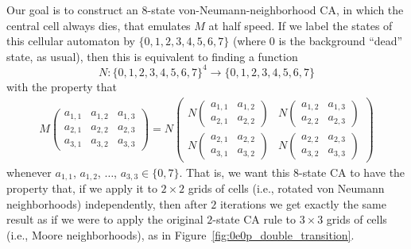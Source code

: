 Our goal is to construct an $8$-state von-Neumann-neighborhood CA, in which the central cell always dies, that emulates $M$ at half speed. If we label the states of this cellular automaton by $\{ 0, 1, 2, 3, 4, 5, 6, 7 \}$ (where $0$ is the background ``dead'' state, as usual), then this is equivalent to finding a function
\[
	N : \{ 0, 1, 2, 3, 4, 5, 6, 7 \}^4 \rightarrow
	\{0, 1, 2, 3, 4, 5, 6, 7 \}
\]
with the property that
\begin{align}\label{eq:0e0p_N_from_M}
	M\begin{pmatrix}
		a_{1,1} & a_{1,2} & a_{1,3} \\
		a_{2,1} & a_{2,2} & a_{2,3} \\
		a_{3,1} & a_{3,2} & a_{3,3}
	\end{pmatrix} = N\begin{pmatrix}
		N\begin{pmatrix}
		a_{1,1} & a_{1,2} \\
		a_{2,1} & a_{2,2}
		\end{pmatrix} & N\begin{pmatrix}
		a_{1,2} & a_{1,3} \\
		a_{2,2} & a_{2,3}
		\end{pmatrix} \\
		N\begin{pmatrix}
		a_{2,1} & a_{2,2} \\
		a_{3,1} & a_{3,2}
		\end{pmatrix} & N\begin{pmatrix}
		a_{2,2} & a_{2,3} \\
		a_{3,2} & a_{3,3}
		\end{pmatrix}
	\end{pmatrix}
\end{align}
whenever $a_{1,1}$, $a_{1,2}$, $\ldots$, $a_{3,3} \in \{0,7\}$. That is, we want this $8$-state CA to have the property that, if we apply it to $2 \times 2$ grids of cells (i.e., rotated von Neumann neighborhoods) independently, then after $2$ iterations we get exactly the same result as if we were to apply the original $2$-state CA rule to $3 \times 3$ grids of cells (i.e., Moore neighborhoods), as in Figure~\ref{fig:0e0p_double_transition}.

